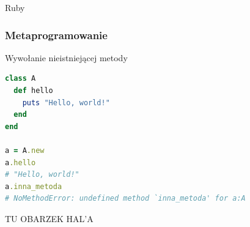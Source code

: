 \begin{frame}[plain]
\begin{block}{}
\begin{centering}
\color{violet}Ruby
   
   
   

\end{centering}
\end{block}
\end{frame}

\begin{frame}[fragile]
\frametitle{Metaprogramowanie}
\begin{block}{Wywołanie nieistniejącej metody}
\begin{lstlisting}[language=Ruby]
class A
  def hello
    puts "Hello, world!"
  end
end

a = A.new
a.hello
# "Hello, world!"
a.inna_metoda
# NoMethodError: undefined method `inna_metoda' for a:A
\end{lstlisting}
\end{block}
\end{frame}

\begin{frame}[plain]
  TU OBARZEK HAL'A
\end{frame}

